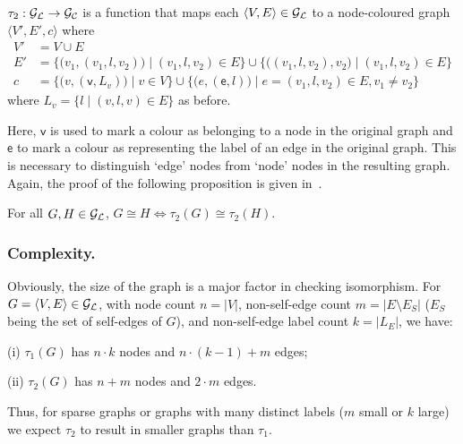 \begin{definition}
\label{def:conversion-labelvertex}
$\tau_2 :\mathcal{G_L} \rightarrow \mathcal{G_C}$ is a function that maps each $\langle
V,E\rangle \in \mathcal{G_L}$ to a node-coloured graph $\langle V', E', c \rangle$ where
\begin{align*}
V'& = V \cup E \\
E'& = \bigl\{ \bigl(v_1,(v_1,l,v_2)\bigr) \mid (v_1,l,v_2) \in E \bigr\}
   \cup \bigl\{ \bigl((v_1,l,v_2),v_2\bigr) \mid (v_1,l,v_2) \in E \bigr\} \\
 c& = \bigl\{ \bigl(v, (\mathsf{v},L_v)\bigr) \mid v \in V \bigr\}
    \cup \bigl\{ \bigl(e, (\mathsf{e},l)\bigr) \mid e=(v_1,l,v_2) \in E, v_1 \neq v_2 \bigr\}
\end{align*}
where $L_v = \{ l \mid (v,l,v) \in E \}$ as before.
\end{definition}
%
Here, $\mathsf{v}$ is used to mark a colour as belonging to a node in the
original graph and $\mathsf{e}$ to mark a colour as representing the label of an
edge in the original graph. This is necessary to distinguish `edge' nodes from
`node' nodes in the resulting graph. Again, the proof of the following
proposition is given in~\cite{kant2010:canonical}.

\begin{proposition}
\label{prop:tau-2-injective}
For all $G,H \in \mathcal{G_L}$, $G \cong H \iff \tau_2(G) \cong \tau_2(H)$.
\end{proposition}

\subsubsection{Complexity.}
%
Obviously, the size of the graph is a major factor in checking isomorphism.
For $G=\langle V,E \rangle \in \mathcal{G_L}$, with node count $n = |V|$, non-self-edge
count $m = |E \setminus E_S|$ ($E_S$ being the set of self-edges of $G$), and
non-self-edge label count $k = |L_E|$, we have:
%
\begin{inparaenum}
\item[(i)] $\tau_1(G)$ has $n \cdot k$ nodes and ${n \cdot (k - 1)} + m$ edges;
\item[(ii)] $\tau_2(G)$ has $n + m$ nodes and $2 \cdot m$ edges.
\end{inparaenum}
%
Thus, for sparse graphs or graphs with many distinct labels ($m$ small or $k$
large) we expect $\tau_2$ to result in smaller graphs than $\tau_1$.
